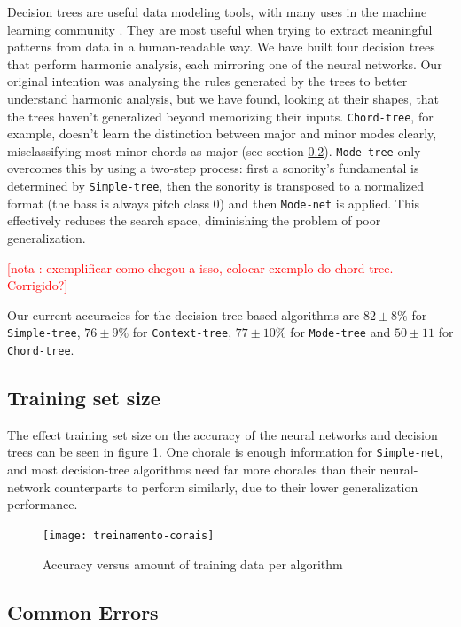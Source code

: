 \documentclass{article}
\newcounter{notacounter}
\newcommand{\nota}[1]{
  \addtocounter{notacounter}{1}
  \textcolor{red}{[nota \arabic{notacounter}: #1]}
}
\begin{document}
Decision trees are useful data modeling tools, with many uses in the
machine learning community \cite{Mitchell:1997:ML,
  russell02:aima}. They are most useful when trying to extract
meaningful patterns from data in a human-readable way. We have built
four decision trees that perform harmonic analysis, each mirroring one
of the neural networks. Our original intention was analysing the rules
generated by the trees to better understand harmonic analysis, but we
have found, looking at their shapes, that the trees haven't
generalized beyond memorizing their inputs. \texttt{Chord-tree}, for example,
doesn't learn the distinction between major and minor modes clearly,
misclassifying most minor chords as major (see section
\ref{sec:common-errors}). \texttt{Mode-tree} only overcomes this by using a
two-step process: first a sonority's fundamental is determined by
\texttt{Simple-tree}, then the sonority is transposed to a normalized
format (the bass is always pitch class 0) and then \texttt{Mode-net}
is applied. This effectively reduces the search space, diminishing the
problem of poor generalization. \nota{exemplificar como
  chegou a isso, colocar exemplo do chord-tree. Corrigido?}

Our current accuracies for the decision-tree based algorithms are $82
\pm 8\%$ for \texttt{Simple-tree}, $76 \pm 9\%$ for
\texttt{Context-tree}, $77 \pm 10\%$ for \texttt{Mode-tree} and $50
\pm 11$ for \texttt{Chord-tree}.

\subsection{Training set size}

The effect training set size on the accuracy of the neural networks
and decision trees can be seen in figure
\ref{fig:treinamento-corais}. One chorale is enough information for
\texttt{Simple-net}, and most decision-tree algorithms need far more
chorales than their neural-network counterparts to perform similarly,
due to their lower generalization performance.

\begin{figure}
  \texttt{[image: treinamento-corais]}
  \caption{Accuracy versus amount of training data per algorithm}
  \label{fig:treinamento-corais}
\end{figure}


\subsection{Common Errors}
\label{sec:common-errors}
\end{document}
